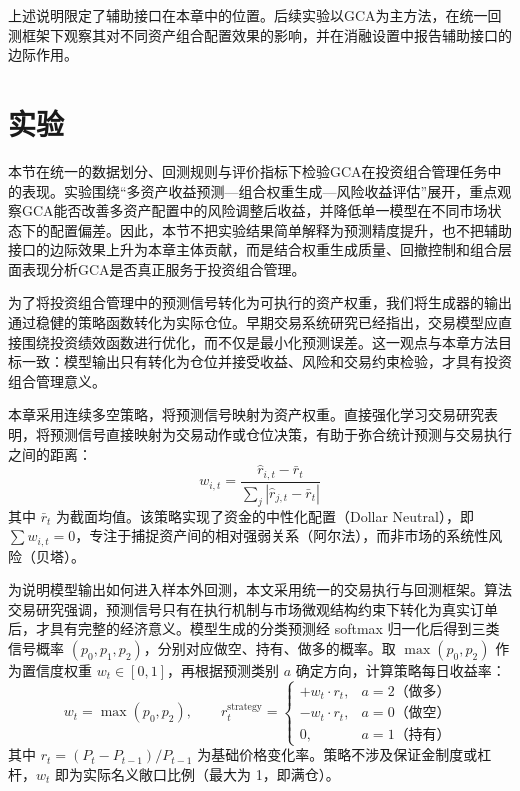 上述说明限定了辅助接口在本章中的位置。后续实验以GCA为主方法，在统一回测框架下观察其对不同资产组合配置效果的影响，并在消融设置中报告辅助接口的边际作用。

\section{实验}

本节在统一的数据划分、回测规则与评价指标下检验GCA在投资组合管理任务中的表现。实验围绕“多资产收益预测—组合权重生成—风险收益评估”展开，重点观察GCA能否改善多资产配置中的风险调整后收益，并降低单一模型在不同市场状态下的配置偏差。因此，本节不把实验结果简单解释为预测精度提升，也不把辅助接口的边际效果上升为本章主体贡献，而是结合权重生成质量、回撤控制和组合层面表现分析GCA是否真正服务于投资组合管理。

为了将投资组合管理中的预测信号转化为可执行的资产权重，我们将生成器的输出通过稳健的策略函数转化为实际仓位。早期交易系统研究已经指出，交易模型应直接围绕投资绩效函数进行优化，而不仅是最小化预测误差\cite{moody1998performance}。这一观点与本章方法目标一致：模型输出只有转化为仓位并接受收益、风险和交易约束检验，才具有投资组合管理意义。

本章采用连续多空策略，将预测信号映射为资产权重。直接强化学习交易研究表明，将预测信号直接映射为交易动作或仓位决策，有助于弥合统计预测与交易执行之间的距离\cite{moody2001learning}：
\begin{equation}
    w_{i,t} = \frac{\hat{r}_{i,t} - \bar{r}_t}{\sum_{j} |\hat{r}_{j,t} - \bar{r}_t|}
\end{equation}
其中 $\bar{r}_t$ 为截面均值。该策略实现了资金的中性化配置（Dollar Neutral），即 $\sum w_{i,t} = 0$，专注于捕捉资产间的相对强弱关系（阿尔法），而非市场的系统性风险（贝塔）。


为说明模型输出如何进入样本外回测，本文采用统一的交易执行与回测框架。算法交易研究强调，预测信号只有在执行机制与市场微观结构约束下转化为真实订单后，才具有完整的经济意义\cite{cartea2015algorithmic}。模型生成的分类预测经 softmax 归一化后得到三类信号概率 $(p_0, p_1, p_2)$，分别对应做空、持有、做多的概率。取 $\max(p_0, p_2)$ 作为置信度权重 $w_t \in [0,1]$，再根据预测类别 $a$ 确定方向，计算策略每日收益率：
\[
w_t = \max(p_0, p_2), \qquad
r_t^{\text{strategy}} =
\begin{cases}
  +w_t \cdot r_t, & a = 2 \text{（做多）} \\
  -w_t \cdot r_t, & a = 0 \text{（做空）} \\
  0, & a = 1 \text{（持有）}
\end{cases}
\]
其中 $r_t = (P_t - P_{t-1}) / P_{t-1}$ 为基础价格变化率。策略不涉及保证金制度或杠杆，$w_t$ 即为实际名义敞口比例（最大为 1，即满仓）。

